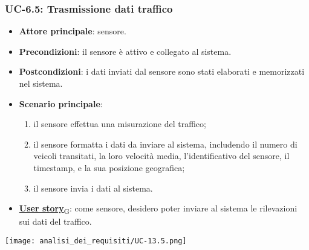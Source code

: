 \subsubsection{UC-6.5: Trasmissione dati traffico}
\begin{itemize}
	\item \textbf{Attore principale}: sensore.
	\item \textbf{Precondizioni}: il sensore è attivo e collegato al sistema.
	\item \textbf{Postcondizioni}: i dati inviati dal sensore sono stati elaborati e memorizzati nel sistema.
	\item \textbf{Scenario principale}:
	      \begin{enumerate}
		      \item il sensore effettua una misurazione del traffico;
		      \item il sensore formatta i dati da inviare al sistema, includendo il numero di veicoli transitati, la loro velocità media, l'identificativo del sensore,
		            il timestamp, e la sua posizione geografica;
		      \item il sensore invia i dati al sistema.
	      \end{enumerate}
	\item \href{https://7last.github.io/docs/rtb/documentazione-interna/glossario\#user-story}{\textbf{User story}\textsubscript{G}}:
	      come sensore, desidero poter inviare al sistema le rilevazioni sui dati del traffico.
\end{itemize}

\begin{center}
	\texttt{[image: analisi\_dei\_requisiti/UC-13.5.png]}
\end{center}

